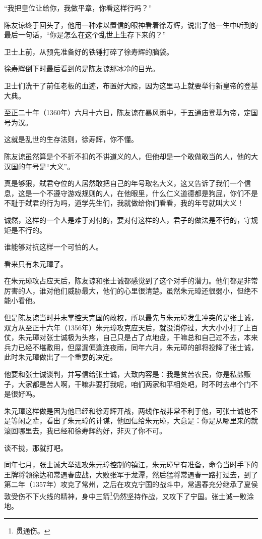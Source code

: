 \begin{multicols}{\theparacolNo}
		“我把皇位让给你，我做平章，你看这样行吗？”

		陈友谅终于回头了，他用一种难以置信的眼神看着徐寿辉，说出了他一生中听到的最后一句话，“你是怎么在这个乱世上生存下来的？”

		卫士上前，从预先准备好的铁锤打碎了徐寿辉的脑袋。

		徐寿辉倒下时最后看到的是陈友谅那冰冷的目光。

		卫士们洗干了前任老板的血迹，布置好大殿，因为这里马上就要举行新皇帝的登基大典。

		至正二十年（1360年）六月十六日，陈友谅在暴风雨中，于五通庙登基为帝，定国号为汉。

		这就是乱世的生存法则，徐寿辉，你不懂。

		陈友谅虽然算是个不折不扣的不讲道义的人，但他却是一个敢做敢当的人，他的大汉国的年号是“大义”。

		真是够狠，弑君夺位的人居然敢把自己的年号取名大义，这又告诉了我们一个信息，这是一个不遵守游戏规则的人，在他眼里，什么仁义道德都是狗屁，你们不是不耻于弑君的行为吗，道学先生们，我就做给你们看看，我的年号就叫大义！

		诚然，这样的一个人是难于对付的，要对付这样的人，君子的做法是不行的，守规矩是不行的。

		谁能够对抗这样一个可怕的人。

		看来只有朱元璋了。

		在朱元璋攻占应天后，陈友谅和张士诚都感觉到了这个对手的潜力。他们都是非常厉害的人，谁对他们威胁最大，他们的心里很清楚。虽然朱元璋还很弱小，但绝不能小看他。

		但是陈友谅当时并未掌控天完国的政权，所以最先与朱元璋发生冲突的是张士诚，双方从至正十六年（1356年）朱元璋攻克应天后，就没消停过，大大小小打了上百仗，朱元璋对张士诚极为头疼，自己只是占了点地盘，干嘛总和自己过不去，本来兵力已经不堪敷用，但屋漏偏逢连夜雨，同年六月，朱元璋的部将投降了张士诚，此时朱元璋做出了一个重要的决定。

		他要和张士诚谈判，并写信给张士诚，大致内容是：我是贫苦农民，你是私盐贩子，大家都是苦人啊，干嘛非要打我呢，咱们两家和平相处吧，时不时去串个门不是很好吗。

		朱元璋这样做是因为他已经和徐寿辉开战，两线作战非常不利于他，可张士诚也不是等闲之辈，看出了朱元璋的计谋，他回信给朱元璋，大意是：你是从哪里来的就滚回哪里去，我已经和徐寿辉约好，非灭了你不可。

		谈不拢，那就打吧。

		同年七月，张士诚大举进攻朱元璋控制的镇江，朱元璋早有准备，命令当时手下的王牌将领徐达和常遇春应战，大败张军于龙潭，然后猛将常遇春一路打过去，到了第二年（1357年）攻克了常州，之后在攻克宁国的战斗中，常遇春充分继承了夏侯敦受伤不下火线的精神，身中三箭\footnote{贯通伤。}仍然坚持作战，又攻下了宁国。张士诚一败涂地。


\end{multicols}
